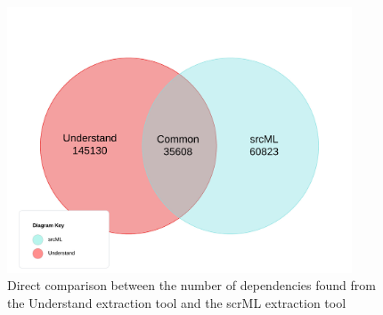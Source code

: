 \documentclass[12pt, dvipsnames, a4paper]{article}
\begin{document}
\begin{figure}[H]
	\center
	\includegraphics[width = 290pt]{assets/UnderstandSrcML.jpeg}
	\caption{Direct comparison between the number of dependencies found from the Understand extraction tool and the scrML extraction tool}
\end{figure}
\end{document}
